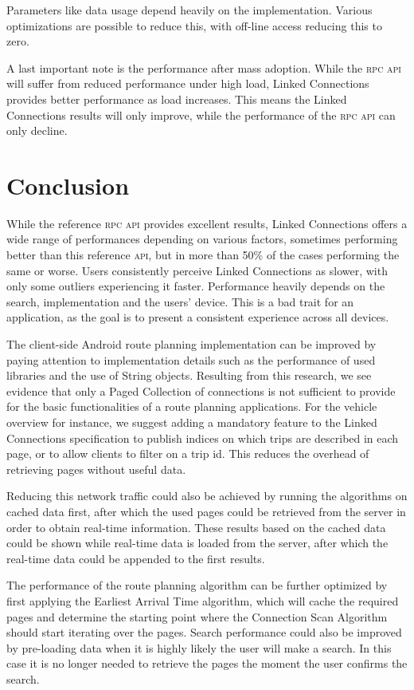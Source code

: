 \documentclass[twocolumn]{phdsymp} %
\begin{document}
Parameters like data usage depend heavily on the implementation. Various optimizations are possible to reduce this, with off-line access reducing this to zero.

A last important note is the performance after mass adoption. While the \textsc{rpc} \textsc{api} will suffer from reduced performance under high load, Linked Connections provides better performance as load increases. This means the Linked Connections results will only improve, while the performance of the \textsc{rpc} \textsc{api} can only decline.

\section{Conclusion}
While the reference \textsc{rpc} \textsc{api} provides excellent results, Linked Connections offers a wide range of performances depending on various factors, sometimes performing better than this reference \textsc{api}, but in more than 50\% of the cases performing the same or worse. Users consistently perceive Linked Connections as slower, with only some outliers experiencing it faster. Performance heavily depends on the search, implementation and the users’ device. This is a bad trait for an application, as the goal is to present a consistent experience across all devices.

The client-side Android route planning implementation can be improved by paying attention to implementation details such as the performance of used libraries and the use of String objects. Resulting from this research, we see evidence that only a Paged Collection of connections is not sufficient to provide for the basic functionalities of a route planning applications. For the vehicle overview for instance, we suggest adding a mandatory feature to the Linked Connections specification to publish indices on which trips are described in each page, or to allow clients to filter on a trip id. This reduces the overhead of retrieving pages without useful data.

Reducing this network traffic could also be achieved by running the algorithms on cached data first, after which the used pages could be retrieved from the server in order to obtain real-time information. These results based on the cached data could be shown while real-time data is loaded from the server, after which the real-time data could be appended to the first results.

The performance of the route planning algorithm can be further optimized by first applying the Earliest Arrival Time algorithm, which will cache the required pages and determine the starting point where the Connection Scan Algorithm should start iterating over the pages. Search performance could also be improved by pre-loading data when it is highly likely the user will make a search. In this case it is no longer needed to retrieve the pages the moment the user confirms the search.
\end{document}
